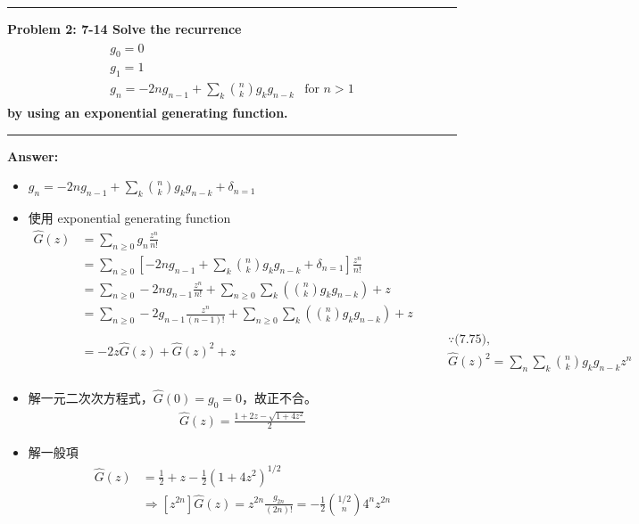 \documentclass[11pt,fleqn]{article}
\newcommand\question[2]{\vspace{.25in}\hrule\textbf{#1: #2}\vspace{.5em}\hrule\vspace{.10in}}
\renewcommand\part[1]{\vspace{.10in}\textbf{#1}}
\begin{document}
\question{Problem 2} {7-14 Solve the recurrence
	\begin{align*}
	\begin{matrix}
	g_0 = 0 & \\ 
	g_1 = 1 & \\
 	g_n = -2n g_{n-1} + \sum_{k} \binom{n}{k} g_k g_{n-k} & \text{for } n > 1
	\end{matrix}
	\end{align*}
	by using an exponential generating function.
}

\part{Answer:}

\begin{itemize}
	\item $g_n = -2n g_{n-1} + \sum_{k} \binom{n}{k} g_k g_{n-k} + \delta_{n=1}$
	\item 使用 exponential generating function
		\begin{align*}
			\widehat{G}(z) 
				&= \sum_{n \ge 0} g_n \frac{z^n}{n!} \\
				&= \sum_{n \ge 0} \left [ -2n g_{n-1} + \sum_{k} \binom{n}{k} g_k g_{n-k} + \delta_{n=1} \right ] \frac{z^n}{n!} \\
				&= \sum_{n \ge 0} -2n g_{n-1} \frac{z^n}{n!} + \sum_{n \ge 0} \sum_{k} \left ( \binom{n}{k} g_k g_{n-k} \right ) + z \\
				&= \sum_{n \ge 0} -2 g_{n-1} \frac{z^n}{(n-1)!} + \sum_{n \ge 0} \sum_{k} \left ( \binom{n}{k} g_k g_{n-k} \right ) + z\\
				&= -2 z \widehat{G}(z) + \widehat{G}(z)^2 + z &&
					\begin{aligned}
						&\because\text{(7.75), }\\ 
						&\widehat{G}(z)^2 = \sum_n \sum_k \binom{n}{k} g_k g_{n-k} z^n
					\end{aligned}
		\end{align*}
	\item 解一元二次次方程式，$\widehat{G}(0)= g_0 = 0$，故正不合。
		\begin{align*}
			\widehat{G}(z) = \frac{1+2z-\sqrt{1+4z^2}}{2}
		\end{align*}
	\item 解一般項 
		\begin{align*}
			\widehat{G}(z) &= \frac{1}{2} + z - \frac{1}{2}(1+4z^2)^{1/2} \\
			& \Rightarrow [z^{2n}] \widehat{G}(z) = z^{2n} \frac{g_{2n}}{(2n)!} = - \frac{1}{2} \binom{1/2}{n} 4^n z^{2n} 

\end{align*}
\end{itemize}
\end{document}

